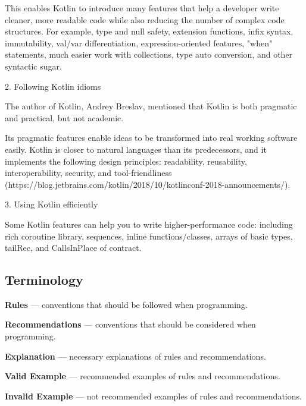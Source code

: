     This enables Kotlin to introduce many features that help a developer write cleaner, more readable code while also reducing the number of complex code structures. For example, type and null safety, extension functions, infix syntax, immutability, val/var differentiation, expression-oriented features, "when" statements, much easier work with collections, type auto conversion, and other syntactic sugar.



2. Following Kotlin idioms



    The author of Kotlin, Andrey Breslav, mentioned that Kotlin is both pragmatic and practical, but not academic. 

    Its pragmatic features enable ideas to be transformed into real working software easily. Kotlin is closer to natural languages than its predecessors, and it implements the following design principles: readability, reusability, interoperability, security, and tool-friendliness (https://blog.jetbrains.com/kotlin/2018/10/kotlinconf-2018-announcements/).



3. Using Kotlin efficiently



    Some Kotlin features can help you to write higher-performance code: including rich coroutine library, sequences, inline functions/classes, arrays of basic types, tailRec, and CallsInPlace of contract.



\subsection*{\textbf{Terminology}}



\textbf{Rules} — conventions that should be followed when programming.



\textbf{Recommendations} — conventions that should be considered when programming.



\textbf{Explanation} — necessary explanations of rules and recommendations.



\textbf{Valid Example} — recommended examples of rules and recommendations.



\textbf{Invalid Example} — not recommended examples of rules and recommendations.



